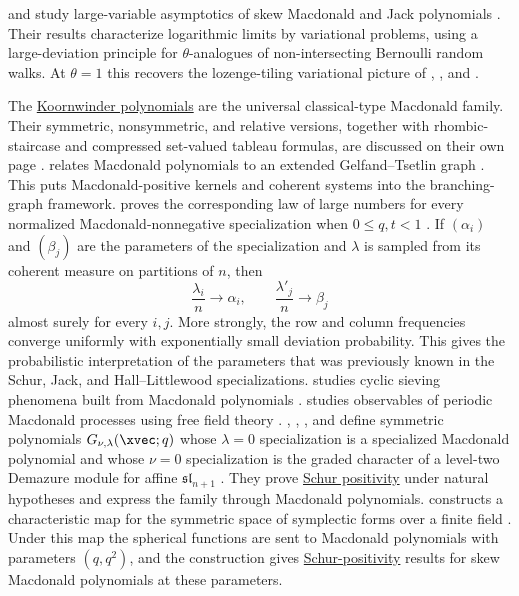  and  study large-variable
asymptotics of skew Macdonald and Jack polynomials
\cite{GuionnetHuang2026}.  Their results characterize logarithmic limits by
variational problems, using a large-deviation principle for
$\theta$-analogues of non-intersecting Bernoulli random walks.  At
$\theta=1$ this recovers the lozenge-tiling variational picture of
, , and .

The \hyperref[koornwinderPolynomial]{Koornwinder polynomials} are the universal
classical-type Macdonald family.  Their symmetric, nonsymmetric, and relative
versions, together with rhombic-staircase and compressed set-valued tableau
formulas, are discussed on their own page
\cite{CorteelMandelshtamWilliams2024,ColmenarejoGagnonRam2026x}.
 relates Macdonald polynomials to an extended
Gelfand--Tsetlin graph \cite{Olshanski2021}.  This puts Macdonald-positive
kernels and coherent systems into the branching-graph framework.
 proves the corresponding law of large numbers for every
normalized Macdonald-nonnegative specialization when $0\leq q,t<1$
\cite[Thm.~1.1]{Gorin2026x}.  If $(\alpha_i)$ and $(\beta_j)$ are the
parameters of the specialization and $\lambda$ is sampled from its coherent
measure on partitions of $n$, then
\[
  \frac{\lambda_i}{n}\longrightarrow\alpha_i,
  \qquad
  \frac{\lambda'_j}{n}\longrightarrow\beta_j
\]
almost surely for every $i,j$.  More strongly, the row and column frequencies
converge uniformly with exponentially small deviation probability.  This
gives the probabilistic interpretation of the parameters that was previously
known in the Schur, Jack, and Hall--Littlewood specializations.
 studies cyclic sieving phenomena built from Macdonald
polynomials \cite{Oh2022}.
 studies observables of periodic Macdonald processes
using free field theory \cite{Koshida2021}.
, , , and
 define symmetric polynomials $G_{\nu,\lambda}(\xvec;q)$
whose $\lambda=0$ specialization is a specialized Macdonald polynomial and
whose $\nu=0$ specialization is the graded character of a level-two
Demazure module for affine $\mathfrak{sl}_{n+1}$
\cite{BiswalChariShereenWand2019x}.  They prove
\hyperref[schurPositiveDefinition]{Schur positivity} under
natural hypotheses and express the family through Macdonald polynomials.
 constructs a characteristic map for the symmetric space of
symplectic forms over a finite field \cite{He2020}.  Under this map the
spherical functions are sent to Macdonald polynomials with parameters
$(q,q^2)$, and the construction gives
\hyperref[schurPositiveDefinition]{Schur-positivity} results for skew Macdonald
polynomials at these parameters.

